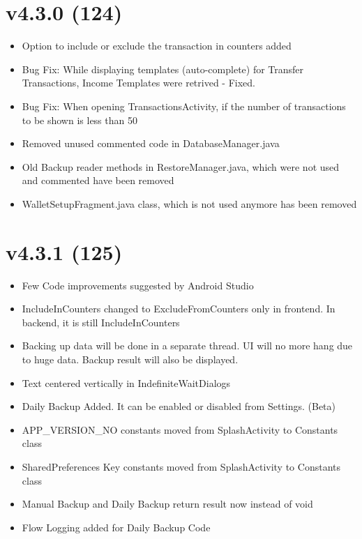 \documentclass{article}
\begin{document}
    \section{v4.3.0 (124)}\label{sec:124}
    \begin{itemize}
        \item Option to include or exclude the transaction in counters added
        \item Bug Fix: While displaying templates (auto-complete) for Transfer Transactions, Income Templates were retrived - Fixed.
        \item Bug Fix: When opening TransactionsActivity, if the number of transactions to be shown is less than 50
        \item Removed unused commented code in DatabaseManager.java
        \item Old Backup reader methods in RestoreManager.java, which were not used and commented have been removed
        \item WalletSetupFragment.java class, which is not used anymore has been removed
    \end{itemize}

    \section{v4.3.1 (125)}\label{sec:125}
    \begin{itemize}
        \item Few Code improvements suggested by Android Studio
        \item IncludeInCounters changed to ExcludeFromCounters only in frontend.
        In backend, it is still IncludeInCounters
        \item Backing up data will be done in a separate thread.
        UI will no more hang due to huge data.
        Backup result will also be displayed.
        \item Text centered vertically in IndefiniteWaitDialogs
        \item Daily Backup Added.
        It can be enabled or disabled from Settings. (Beta)
        \item APP\_VERSION\_NO constants moved from SplashActivity to Constants class
        \item SharedPreferences Key constants moved from SplashActivity to Constants class
        \item Manual Backup and Daily Backup return result now instead of void
        \item Flow Logging added for Daily Backup Code
    \end{itemize}
\end{document}
